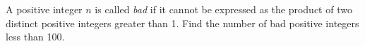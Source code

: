 A positive integer $n$ is called \emph{bad} if it cannot be expressed as the product of two distinct positive integers greater than 1. Find the number of bad positive integers less than 100.
